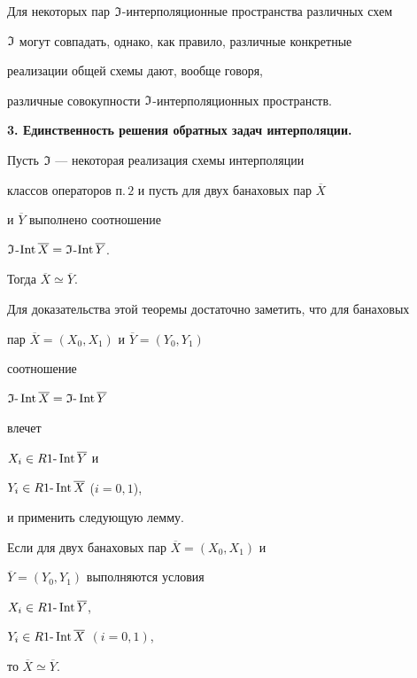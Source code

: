 Для некоторых пар $\frak I$-интерполяционные пространства различных схем 


$\frak I$ могут совпадать, однако, как правило, различные конкретные 


реализации общей схемы дают, вообще говоря, 


различные совокупности $\frak I$-интерполяционных пространств.  


\medskip





{\bf 3. Единственность решения обратных задач интерполяции.}





\begin{thm}


Пусть $\frak I$ --- некоторая реализация схемы интерполяции 


классов операторов п.\,$2$ и пусть для двух банаховых пар $\overline X$ 


и $\overline Y$ выполнено соотношение


$\frak I$-$\Int\overline X =


\frak I$-$\Int\overline Y$.


Тогда $\overline X \simeq \overline Y$.


\end{thm}





Для доказательства этой теоремы достаточно заметить, что для банаховых 


пар $\overline X = (X_0,X_1)$ и $\overline Y = (Y_0,Y_1)$


соотношение 


$\frak I\text{-}\Int \overline X =


\frak I\text{-}\Int\overline Y$ 


влечет 


$X_i \in R1\text{-}\operatorname{Int} \overline Y$ и


$Y_i \in R1\text{-}\operatorname{Int} \overline X$ ($i=0,1$), 


и применить следующую лемму. 





\begin{lem}


Если для двух банаховых пар $\overline X =(X_0,X_1)$ и


$\overline Y = (Y_0,Y_1)$ выполняются условия


$X_i \in R1\text{-}\operatorname{Int} \overline Y$, 


$Y_i \in R1\text{-}\operatorname{Int} \overline X$ $(i=0,1)$, 


то $\overline X \simeq \overline Y$.


\end{lem}





